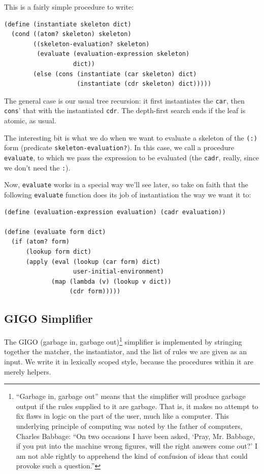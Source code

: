 \documentclass[9pt]{report}
\begin{document}
This is a fairly simple procedure to write:

\begin{verbatim}
(define (instantiate skeleton dict)
  (cond ((atom? skeleton) skeleton)
        ((skeleton-evaluation? skeleton)
         (evaluate (evaluation-expression skeleton)
                   dict))
        (else (cons (instantiate (car skeleton) dict)
                    (instantiate (cdr skeleton) dict)))))
\end{verbatim}

The general case is our usual tree recursion: it first
instantiates the \texttt{car}, then \texttt{cons}' that with the instantiated
\texttt{cdr}. The depth-first search ends if the leaf is atomic, as
usual.

The interesting bit is what we do when we want to evaluate a
skeleton of the \texttt{(:)} form (predicate \texttt{skeleton-evaluation?}). In
this case, we call a procedure \texttt{evaluate}, to which we pass the
expression to be evaluated (the \texttt{cadr}, really, since we don't
need the \texttt{:}).

Now, \texttt{evaluate} works in a special way we'll see later, so take on
faith that the following \texttt{evaluate} function does its job of
instantiation the way we want it to:

\begin{verbatim}
(define (evaluation-expression evaluation) (cadr evaluation))

(define (evaluate form dict)
  (if (atom? form)
      (lookup form dict)
      (apply (eval (lookup (car form) dict)
                   user-initial-environment)
             (map (lambda (v) (lookup v dict))
                  (cdr form)))))
\end{verbatim}

\subsection{GIGO Simplifier}
\label{sec:org13db6b4}

The GIGO (garbage in, garbage out)\footnote{``Garbage in, garbage out'' means that the simplifier will
produce garbage output if the rules supplied to it are garbage. That
is, it makes no attempt to fix flaws in logic on the part of the user,
much like a computer. This underlying principle of computing was noted
by the father of computers, Charles Babbage: ``On two occasions I have
been asked, `Pray, Mr. Babbage, if you put into the machine wrong
figures, will the right answers come out?' I am not able rightly
to apprehend the kind of confusion of ideas that could provoke such a
question.''} simplifier is implemented
by stringing together the matcher, the instantiator, and the list
of rules we are given as an input. We write it in lexically scoped
style, because the procedures within it are merely helpers.
\end{document}
